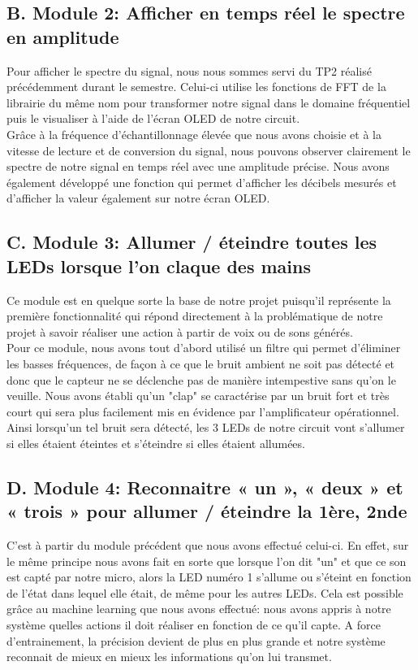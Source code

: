 \documentclass[a4paper,11pt]{book}
\begin{document}
\subsection*{B. Module 2: Afficher en temps réel le spectre en amplitude}
Pour afficher le spectre du signal, nous nous sommes servi du TP2 réalisé précédemment durant le semestre. Celui-ci utilise les fonctions de FFT de la librairie du même nom pour transformer notre signal dans le domaine fréquentiel puis le visualiser à l'aide de l'écran OLED de notre circuit. \\ 
Grâce à la fréquence d'échantillonnage élevée que nous avons choisie et à la vitesse de lecture et de conversion du signal, nous pouvons observer clairement le spectre de notre signal en temps réel avec une amplitude précise. Nous avons également développé une fonction qui permet d'afficher les décibels mesurés et d'afficher la valeur également sur notre écran OLED.

\subsection*{C. Module 3: Allumer / éteindre toutes les LEDs lorsque l’on claque des mains }

Ce module est en quelque sorte la base de notre projet puisqu'il représente la première fonctionnalité qui répond directement à la problématique de notre projet à savoir réaliser une action à partir de voix ou de sons générés. \\ 
Pour ce module, nous avons tout d'abord utilisé un filtre qui permet d'éliminer les basses fréquences, de façon à ce que le bruit ambient ne soit pas détecté et donc que le capteur ne se déclenche pas de manière intempestive sans qu'on le veuille. Nous avons établi qu'un "clap" se caractérise par un bruit fort et très court qui sera plus facilement mis en évidence par l'amplificateur opérationnel. Ainsi lorsqu'un tel bruit sera détecté, les 3 LEDs de notre circuit vont s'allumer si elles étaient éteintes et s'éteindre si elles étaient allumées. \\ 

\subsection*{D. Module 4: Reconnaitre « un », « deux » et « trois » pour allumer / éteindre la 1ère, 2nde }

C'est à partir du module précédent que nous avons effectué celui-ci. En effet, sur le même principe nous avons fait en sorte que lorsque l'on dit "un" et que ce son est capté par notre micro, alors la LED numéro 1 s'allume ou s'éteint en fonction de l'état dans lequel elle était, de même pour les autres LEDs. Cela est possible grâce au machine learning que nous avons effectué: nous avons appris à notre système quelles actions il doit réaliser en fonction de ce qu'il capte. A force d'entrainement, la précision devient de plus en plus grande et notre système reconnait de mieux en mieux les informations qu'on lui transmet.
\end{document}
